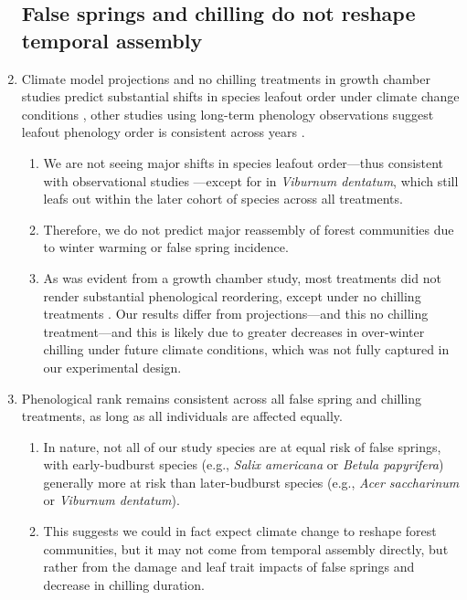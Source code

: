 \documentclass{article}\usepackage[]{graphicx}\usepackage[]{color}
\begin{document}
\begin{enumerate}
\subsection*{False springs and chilling do not reshape temporal assembly}
\item Climate model projections and no chilling treatments in growth chamber studies predict substantial shifts in species leafout order under climate change conditions \citep{Roberts2015, Laube2014}, other studies using long-term phenology observations suggest leafout phenology order is consistent across years \citep{Wesolowski2006}.
  \begin{enumerate}
  \item We are not seeing major shifts in species leafout order---thus consistent with observational studies \citep{Wesolowski2006}---except for in \textit{Viburnum dentatum}, which still leafs out within the later cohort of species across all treatments.
  \item Therefore, we do not predict major reassembly of forest communities due to winter warming or false spring incidence. 
  \item As was evident from a growth chamber study, most treatments did not render substantial phenological reordering, except under no chilling treatments \citep{Laube2014}. Our results differ from projections---and this no chilling treatment---and this is likely due to greater decreases in over-winter chilling under future climate conditions, which was not fully captured in our experimental design.
    \end{enumerate}
    
\item Phenological rank remains consistent across all false spring and chilling treatments, as long as all individuals are affected equally.
  \begin{enumerate}
  \item In nature, not all of our study species are at equal risk of false springs, with early-budburst species (e.g., \textit{Salix americana} or \textit{Betula papyrifera}) generally more at risk than later-budburst species (e.g., \textit{Acer saccharinum} or \textit{Viburnum dentatum}). 
  \item This suggests we could in fact expect climate change to reshape forest communities, but it may not come from temporal assembly directly, but rather from the damage and leaf trait impacts of false springs and decrease in chilling duration.
  \end{enumerate}


\end{enumerate}
\end{document}
